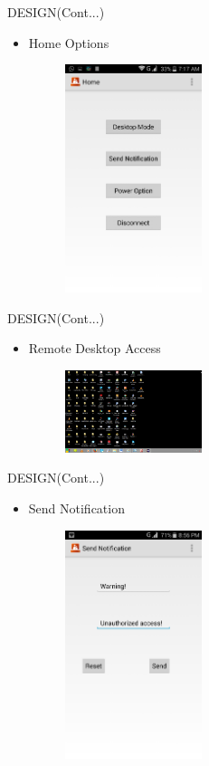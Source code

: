 \begin{frame}{DESIGN(Cont...)}  
   \begin{itemize}
  	\item Home Options
 	 \begin{figure}[ht!]
     \centering
    \includegraphics[width=4cm]{home.png}
    \label{fig:pc control desktop}
\end{figure}
   \end{itemize}
 \end{frame} 
 
\begin{frame}{DESIGN(Cont...)}  
   \begin{itemize}
  	\item Remote Desktop Access
 	 \begin{figure}[ht!]
     \centering
    \includegraphics[width=4cm]{desk.png}
    \label{fig:pc control desktop}
\end{figure}
   \end{itemize}
 \end{frame} 
 
\begin{frame}{DESIGN(Cont...)}  
   \begin{itemize}
  	\item Send Notification
 	 \begin{figure}[ht!]
     \centering
    \includegraphics[width=4cm]{message.png}
    \label{fig:pc control desktop}
\end{figure}
   \end{itemize}
 \end{frame} 
 
